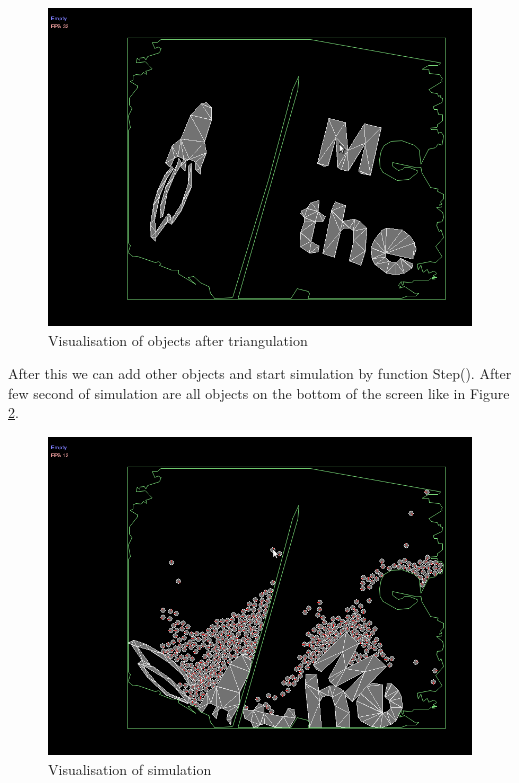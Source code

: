 \documentclass{ifacconf}
\begin{document}
\begin{figure}[h]
\includegraphics[width=\columnwidth]{images/6dynamic-objets.png}
\caption{Visualisation of objects after triangulation}
\label{fig:objects}
\end{figure}

After this we can add other objects and start simulation by function Step().
After few second of simulation are all objects on the bottom of the screen like
in Figure \ref{fig:simulation}.

\begin{figure}[h]
\includegraphics[width=\columnwidth]{images/7dynamic-objets-simulation.png}
\caption{Visualisation of simulation}
\label{fig:simulation}
\end{figure}
\end{document}
